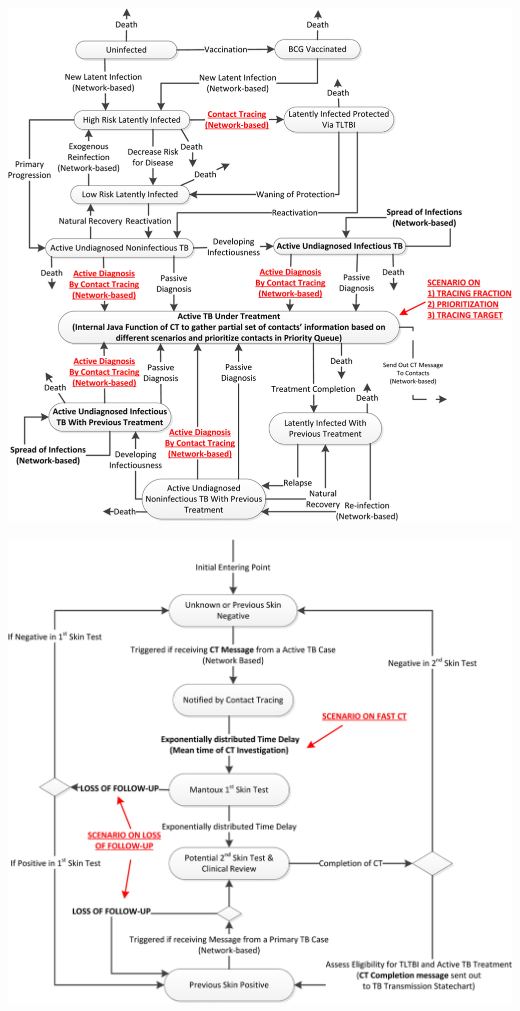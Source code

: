 \documentclass[aspectratio=43]{beamer}
\begin{document}
\begin{frame}
\begin{center}
\includegraphics[width=\textwidth]{FIGS/TianOsgood_etal_state_flow_agent.jpeg}
\end{center}
\end{frame}


\begin{frame}
\begin{center}
\includegraphics[width=\textwidth]{FIGS/TianOsgood_etal_model_CT.jpeg}
\end{center}
\end{frame}
\end{document}
